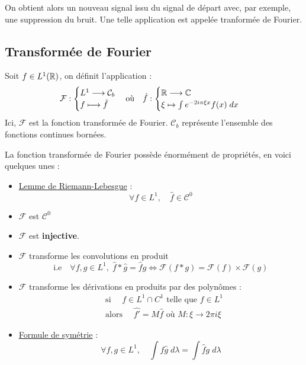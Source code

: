 On obtient alors un nouveau signal issu du signal de départ avec, par exemple, une suppression du bruit. 
Une telle application est appelée tranformée de Fourier. 

\subsection{Transformée de Fourier}

\begin{definition}
    Soit $f \in L^1(\mathbb{R})$, on définit l'application :
        \[ \mathcal{F} : 
            \begin{cases}
                L^1 \longrightarrow \mathcal{C}_b \\
                f \longmapsto \hat{f} 
            \end{cases}
        \text{où} \quad 
        \hat{f} :
        \begin{cases}
            \mathbb{R} \longrightarrow \mathbb{C} \\
            \xi \mapsto \int e^{-2i\pi \xi x} f(x) \; dx 
        \end{cases}
        \]
    Ici, $\mathcal{F}$ est la fonction transformée de Fourier. $\mathcal{C}_b$ représente l'ensemble des fonctions continues bornées. 
\end{definition}

\begin{prop}
    La fonction transformée de Fourier possède énormément de propriétés, en voici quelques unes :
    \begin{itemize}
        \item \underline{Lemme de Riemann-Lebesgue} :
            \[ \boxed{ \forall f \in L^1, \quad \hat{f} \in \mathcal{C}^0 } \]
       \item $\mathcal{F}$ est $\mathcal{C}^0$
       \item $\mathcal{F}$ est \textbf{injective}. 
       \item $\mathcal{F}$ transforme les convolutions en produit 
        \[ \boxed{ \text{i.e} \quad \forall f,g \in L^1, \; \hat{f} \ast \hat{g} = \hat{f} \hat{g} \iff \mathcal{F}(f \ast g) = \mathcal{F}(f) \times \mathcal{F}(g) }\] 
        \item $\mathcal{F}$ transforme les dérivations en produits par des polynômes : 
            \begin{align*}
                & \text{si } \quad f \in L^1 \cap C^1 \text{ telle que } f \in L^1 \\ 
                & \text{alors } \quad \widehat{f'} = M \hat{f} \text{ où } M : \xi \longrightarrow 2 \pi i \xi  
            \end{align*}
        \item \underline{Formule de symétrie} :
            \[ \forall f,g \in L^1, \quad \int f \hat{g} \; d \lambda = \int \hat{f} g \; d \lambda \] 
    \end{itemize}
\end{prop}

